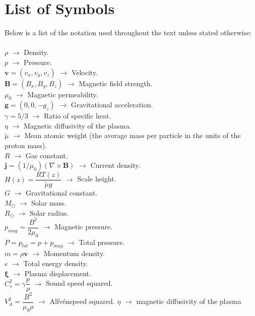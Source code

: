 \documentclass[12pt]{ociamthesis}
\newcommand{\Alfven}{Alfv\'{e}n}
\begin{document}
\baselineskip=18pt

\setcounter{secnumdepth}{3}
\setcounter{tocdepth}{3}

\section*{List of Symbols}
Below is a list of the notation used throughout the text unless stated otherwise: \\ \\
$\rho$ $\rightarrow$ Density.  \\
$p$ $\rightarrow$ Pressure. \\
$\boldsymbol{v} = (v_x, v_y, v_z)$ $\rightarrow$ Velocity.  \\
$\boldsymbol{B} = (B_x,B_y,B_z)$ $\rightarrow$ Magnetic field strength. \\
$\mu_0$ $\rightarrow$ Magnetic permeability. \\
$\boldsymbol{g} = (0,0,-g_z)$ $\rightarrow$ Gravitational acceleration. \\
$\gamma = 5/3$ $\rightarrow$ Ratio of specific heat. \\
$\eta$ $\rightarrow$ Magnetic diffusivity of the plasma. \\
$\widetilde{\mu}$ $\rightarrow$ Mean atomic weight (the average mass per particle in the units of the proton mass).  \\
$R$ $\rightarrow$ Gas constant.\\
$\boldsymbol{j} = (1 / \mu_0) (\nabla \times \boldsymbol{B})$ $\rightarrow$ Current density.  \\
$H(z) = \dfrac{R T(z)}{\widetilde{\mu} g}$ $\rightarrow$ Scale height.  \\
$G$ $\rightarrow$ Gravitational constant. \\
$M_{\odot}$ $\rightarrow$ Solar mass. \\
$R_{\odot}$ $\rightarrow$ Solar radius. \\
$p_{mag} = \dfrac{B^2}{2 \mu_0} $ $\rightarrow$ Magnetic pressure. \\
$P=p_{tot} = p + p_{mag} $ $\rightarrow$ Total pressure. \\
$m = \rho \boldsymbol{v}$ $\rightarrow$ Momentum density. \\
$e$ $\rightarrow$ Total energy density. \\ 
$\boldsymbol{\xi}$ $\rightarrow$ Plasma displacement. \\
$C^2_s = \gamma \dfrac{p}{\rho}$ $\rightarrow$ Sound speed squared. \\ 
$V_A^2=\dfrac{B^2}{\mu_0 \rho}$ $\rightarrow$ \Alfven speed squared. 
$\eta$ $\rightarrow$ magnetic diffusivity of the plasma
\clearpage
\setcounter{page}{1}
\end{document}
